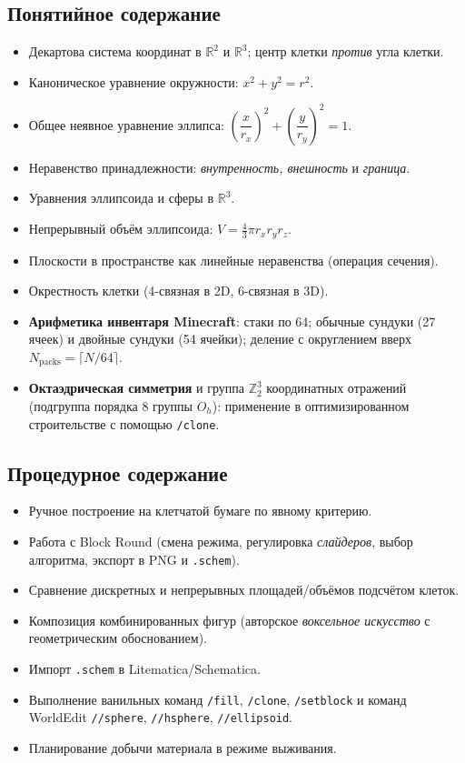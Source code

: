 \documentclass[12pt,a4paper]{scrartcl}
\newcommand{\acc}[1]{\textcolor{accent}{\textbf{#1}}}
\newcommand{\cmd}[1]{\textcolor{earth}{\texttt{\small #1}}}
\begin{document}
\subsection{Понятийное содержание}
\begin{itemize}[leftmargin=1.3em,itemsep=0.15em,topsep=0.3em]
  \item Декартова система координат в $\mathbb{R}^2$ и $\mathbb{R}^3$; центр клетки \emph{против} угла клетки.
  \item Каноническое уравнение окружности: $x^2 + y^2 = r^2$.
  \item Общее неявное уравнение эллипса: $\left(\dfrac{x}{r_x}\right)^{\!2} + \left(\dfrac{y}{r_y}\right)^{\!2} = 1$.
  \item Неравенство принадлежности: \emph{внутренность, внешность} и \emph{граница}.
  \item Уравнения эллипсоида и сферы в $\mathbb{R}^3$.
  \item Непрерывный объём эллипсоида: $V = \tfrac{4}{3}\pi r_x r_y r_z$.
  \item Плоскости в пространстве как линейные неравенства (операция сечения).
  \item Окрестность клетки (4-связная в 2D, 6-связная в 3D).
  \item \acc{Арифметика инвентаря Minecraft}: стаки по 64; обычные сундуки (27 ячеек) и двойные сундуки (54 ячейки); деление с округлением вверх $N_{\mathrm{packs}} = \lceil N/64 \rceil$.
  \item \acc{Октаэдрическая симметрия} и группа $\mathbb{Z}_2^3$ координатных отражений (подгруппа порядка 8 группы $O_h$): применение в оптимизированном строительстве с помощью \cmd{/clone}.
\end{itemize}

\subsection{Процедурное содержание}
\begin{itemize}[leftmargin=1.3em,itemsep=0.15em,topsep=0.3em]
  \item Ручное построение на клетчатой бумаге по явному критерию.
  \item Работа с Block Round (смена режима, регулировка \emph{слайдеров}, выбор алгоритма, экспорт в PNG и \texttt{.schem}).
  \item Сравнение дискретных и непрерывных площадей/объёмов подсчётом клеток.
  \item Композиция комбинированных фигур (авторское \emph{воксельное искусство} с геометрическим обоснованием).
  \item Импорт \texttt{.schem} в Litematica/Schematica.
  \item Выполнение ванильных команд \cmd{/fill}, \cmd{/clone}, \cmd{/setblock} и команд WorldEdit \cmd{//sphere}, \cmd{//hsphere}, \cmd{//ellipsoid}.
  \item Планирование добычи материала в режиме выживания.
\end{itemize}
\end{document}
